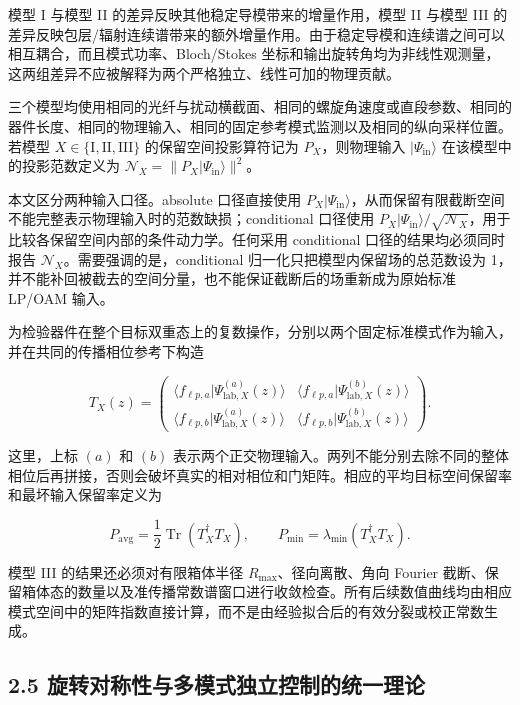\documentclass[
  UTF8,
  zihao=-4,
  fontset=fandol]{ctexart}
\begin{document}
模型 I 与模型 II 的差异反映其他稳定导模带来的增量作用，模型 II 与模型
III
的差异反映包层/辐射连续谱带来的额外增量作用。由于稳定导模和连续谱之间可以相互耦合，而且模式功率、Bloch/Stokes
坐标和输出旋转角均为非线性观测量，这两组差异不应被解释为两个严格独立、线性可加的物理贡献。

三个模型均使用相同的光纤与扰动横截面、相同的螺旋角速度或直段参数、相同的器件长度、相同的物理输入、相同的固定参考模式监测以及相同的纵向采样位置。若模型
\(X\in\{\mathrm I,\mathrm{II},\mathrm{III}\}\) 的保留空间投影算符记为
\(P_X\)，则物理输入 \(|\Psi_{\mathrm{in}}\rangle\)
在该模型中的投影范数定义为
\(\mathcal N_X=\|P_X|\Psi_{\mathrm{in}}\rangle\|^2\)。

本文区分两种输入口径。absolute 口径直接使用
\(P_X|\Psi_{\mathrm{in}}\rangle\)，从而保留有限截断空间不能完整表示物理输入时的范数缺损；conditional
口径使用
\(P_X|\Psi_{\mathrm{in}}\rangle/\sqrt{\mathcal N_X}\)，用于比较各保留空间内部的条件动力学。任何采用
conditional 口径的结果均必须同时报告
\(\mathcal N_X\)。需要强调的是，conditional
归一化只把模型内保留场的总范数设为
1，并不能补回被截去的空间分量，也不能保证截断后的场重新成为原始标准
LP/OAM 输入。

为检验器件在整个目标双重态上的复数操作，分别以两个固定标准模式作为输入，并在共同的传播相位参考下构造

\[
T_X(z)=
\begin{pmatrix}
\langle f_{\ell p,a}|\Psi^{(a)}_{\mathrm{lab},X}(z)\rangle &
\langle f_{\ell p,a}|\Psi^{(b)}_{\mathrm{lab},X}(z)\rangle\\
\langle f_{\ell p,b}|\Psi^{(a)}_{\mathrm{lab},X}(z)\rangle &
\langle f_{\ell p,b}|\Psi^{(b)}_{\mathrm{lab},X}(z)\rangle
\end{pmatrix}.
\]

这里，上标 \((a)\) 和 \((b)\)
表示两个正交物理输入。两列不能分别去除不同的整体相位后再拼接，否则会破坏真实的相对相位和门矩阵。相应的平均目标空间保留率和最坏输入保留率定义为

\[
P_{\mathrm{avg}}=\frac12\operatorname{Tr}(T_X^\dagger T_X),\qquad
P_{\min}=\lambda_{\min}(T_X^\dagger T_X).
\]

模型 III 的结果还必须对有限箱体半径 \(R_{\max}\)、径向离散、角向 Fourier
截断、保留箱体态的数量以及准传播常数谱窗口进行收敛检查。所有后续数值曲线均由相应模式空间中的矩阵指数直接计算，而不是由经验拟合后的有效分裂或校正常数生成。

\hypertarget{ux65cbux8f6cux5bf9ux79f0ux6027ux4e0eux591aux6a21ux5f0fux72ecux7acbux63a7ux5236ux7684ux7edfux4e00ux7406ux8bba}{%
\subsection{2.5
旋转对称性与多模式独立控制的统一理论}\label{ux65cbux8f6cux5bf9ux79f0ux6027ux4e0eux591aux6a21ux5f0fux72ecux7acbux63a7ux5236ux7684ux7edfux4e00ux7406ux8bba}}
\end{document}
